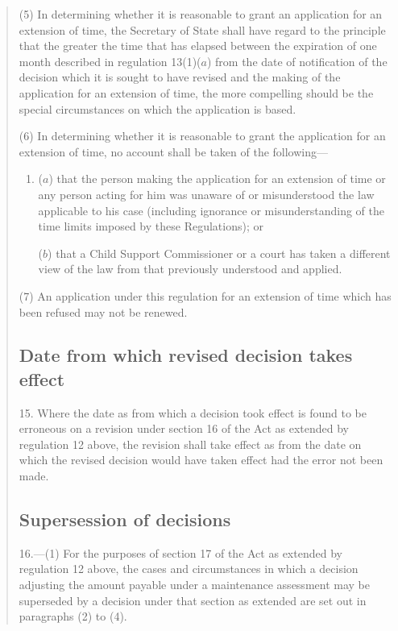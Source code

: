 \documentclass[12pt,a4paper]{article}
\begin{document}
\begin{quotation}
(5) In determining whether it is reasonable to grant an application for an extension of time, the Secretary of State shall have regard to the principle that the greater the time that has elapsed between the expiration of one month described in regulation 13(1)($a$) from the date of notification of the decision which it is sought to have revised and the making of the application for an extension of time, the more compelling should be the special circumstances on which the application is based.

(6) In determining whether it is reasonable to grant the application for an extension of time, no account shall be taken of the following—
\begin{enumerate}\item[]
($a$) that the person making the application for an extension of time or any person acting for him was unaware of or misunderstood the law applicable to his case (including ignorance or misunderstanding of the time limits imposed by these Regulations); or

($b$) that a Child Support Commissioner or a court has taken a different view of the law from that previously understood and applied.
\end{enumerate}

(7) An application under this regulation for an extension of time which has been refused may not be renewed.

\subsection*{Date from which revised decision takes effect}

15.  Where the date as from which a decision took effect is found to be erroneous on a revision under section 16 of the Act as extended by regulation 12 above, the revision shall take effect as from the date on which the revised decision would have taken effect had the error not been made.

\subsection*{Supersession of decisions}

16.—(1) For the purposes of section 17 of the Act as extended by regulation 12 above, the cases and circumstances in which a decision adjusting the amount payable under a maintenance assessment may be superseded by a decision under that section as extended are set out in paragraphs (2) to (4).


\end{quotation}
\end{document}
